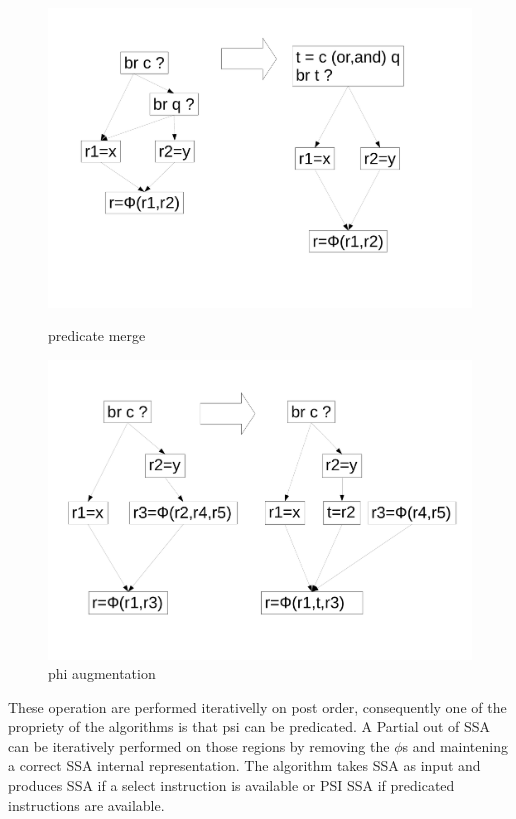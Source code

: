 \begin{figure}
\begin{minipage}[t]{5cm}
\end{minipage}
\begin{minipage}[t]{6cm}
\includegraphics[scale=0.2]{phi_merge.pdf}
\caption{predicate merge}
\end{minipage}
\begin{minipage}[t]{5cm}
\includegraphics[scale=0.2]{phi_augmentation.pdf}
\caption{phi augmentation}
\end{minipage}
\label{fig: phi_operations}
\end{figure}

These operation are performed iterativelly on post order, consequently one of the propriety of the algorithms is that psi can be predicated. A Partial out of SSA can be iteratively performed on those regions by removing the $\phi$s and maintening a correct SSA internal representation. The algorithm takes SSA as input and produces SSA if a select instruction is available or PSI SSA if predicated instructions are available. 

